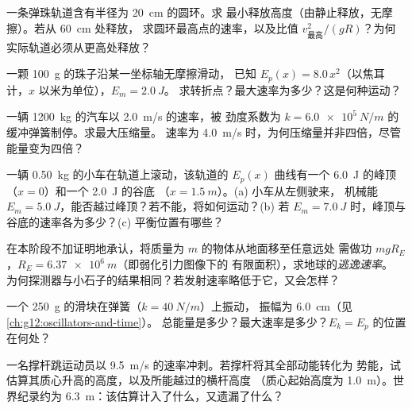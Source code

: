 \begin{exercise}[$\star\star$]\label{exo:g12:work-and-energy:9}
一条弹珠轨道含有半径为 \qty{20}{cm} 的圆环。求
最小释放高度（由静止释放，无摩擦）。若从 \qty{60}{cm} 处释放，
求圆环最高点的速率，以及比值 $v_{\text{最高}}^2/(gR)$？为何
实际轨道必须从更高处释放？
\end{exercise}

\begin{exercise}[$\star\star$]\label{exo:g12:work-and-energy:10}
一颗 \qty{100}{g} 的珠子沿某一坐标轴无摩擦滑动，
已知 $E_p(x) = 8.0\,x^2$（以焦耳计，$x$ 以米为单位），$E_m = \qty{2.0}{J}$。
求转折点？最大速率为多少？这是何种运动？
\end{exercise}

\begin{exercise}[$\star\star$]\label{exo:g12:work-and-energy:11}
一辆 \qty{1200}{kg} 的汽车以 \qty{2.0}{m/s} 的速率，被
劲度系数为 $k = \qty{6.0e5}{N/m}$ 的缓冲弹簧制停。求最大压缩量。
速率为 \qty{4.0}{m/s} 时，为何压缩量并非四倍，尽管能量变为四倍？
\end{exercise}

\begin{exercise}[$\star\star\star$]\label{exo:g12:work-and-energy:12}
一辆 \qty{0.50}{kg} 的小车在轨道上滚动，该轨道的 $E_p(x)$ 曲线有一个
\qty{6.0}{J} 的峰顶（$x = 0$）和一个 \qty{2.0}{J} 的谷底
（$x = \qty{1.5}{m}$）。(a) 小车从左侧驶来，
机械能 $E_m = \qty{5.0}{J}$，能否越过峰顶？若不能，将如何运动？(b) 若
$E_m = \qty{7.0}{J}$ 时，峰顶与谷底的速率各为多少？(c) 平衡位置有哪些？
\end{exercise}

\begin{exercise}[$\star\star\star$]\label{exo:g12:work-and-energy:13}
在本阶段不加证明地承认，将质量为 $m$ 的物体从地面移至任意远处
需做功 $mgR_E$，$R_E = \qty{6.37e6}{m}$（即弱化引力图像下的
有限面积），求地球的\emph{逃逸速率}。
为何探测器与小石子的结果相同？若发射速率略低于它，又会怎样？
\end{exercise}

\begin{exercise}[$\star\star\star$]\label{exo:g12:work-and-energy:14}
一个 \qty{250}{g} 的滑块在弹簧（$k = \qty{40}{N/m}$）上振动，
振幅为 \qty{6.0}{cm}（见\cref{ch:g12:oscillators-and-time}）。
总能量是多少？最大速率是多少？$E_k = E_p$ 的位置在何处？
\end{exercise}

\begin{exercise}[$\star\star\star$]\label{exo:g12:work-and-energy:15}
一名撑杆跳运动员以 \qty{9.5}{m/s} 的速率冲刺。若撑杆将其全部动能转化为
势能，试估算其质心升高的高度，以及所能越过的横杆高度
（质心起始高度为 \qty{1.0}{m}）。世界纪录约为
\qty{6.3}{m}：该估算计入了什么，又遗漏了什么？
\end{exercise}

